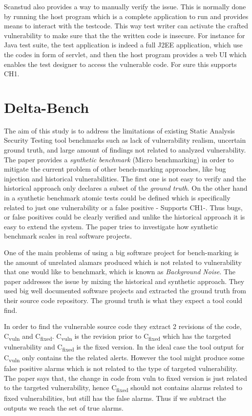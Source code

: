 \documentclass[authoryear,preprint]{sigplanconf}
\begin{document}
Scanstud also provides a way to manually verify the issue. This is normally done by running the host program which is a complete application to run and provides means to interact with the testcode. This way test writer can activate the crafted vulnerability to make sure that the the written code is insecure. For instance for Java test suite, the test application is indeed a full J2EE application, which use the codes in form of servlet, and then the host program provides a web UI which enables the test designer to access the vulnerable code. For sure this supports CH1.

\section{Delta-Bench}
\label{sec:sec_delta}
The aim of this study is to address the limitations of existing Static Analysis Security Testing tool benchmarks such as lack of vulnerability realism, uncertain ground truth, and large amount of findings not related to analyzed vulnerability\cite{8170097}. The paper provides a \textit{synthetic benchmark} (Micro benchmarking) in order to mitigate the current problem of other bench-marking approaches, like bug injection and historical vulnerabilities. The first one is not easy to verify \cite{Dahse:2014:SDS:2671225.2671288} and the historical approach only declares a subset of the \textit{ground truth}. On the other hand in a synthetic benchmark atomic tests could be defined which is specifically related to just one vulnerability or a false positive - Supports CH1-. Thus bugs, or false positives could be clearly verified and unlike the historical approach it is easy to extend the system. The paper tries to investigate how synthetic benchmark scales in real software projects. 

One of the main problems of using a big software project for bench-marking is the amount of unrelated alamars produced which is not related to vulnerability that one would like to benchmark, which is known as \textit{Background Noise}. The paper addresses the issue by mixing the historical and synthetic approach. They used big well documented software projects and extracted the ground truth from their source code repository. The ground truth is what they expect a tool could find.

In order to find the vulnerable source code they extract 2 revisions of the code, C\textsubscript{vuln} and C\textsubscript{fixed}. C\textsubscript{vuln} is the revision prior to C\textsubscript{fixed} which has the targeted vulnerability and C\textsubscript{fixed} is the fixed version. In the ideal case the tool output for C\textsubscript{vuln} only contains the the related alerts. However the tool might produce some false positive alarms which is not related to the type of targeted vulnerability. The paper says that, the change in code from vuln to fixed version is just related to the targeted vulnerability, hence C\textsubscript{fixed} should not contains alarms related to fixed vulnerabilities, but still has the false alarms. Thus if we subtract the outputs we reach the set of true alarms. 
\end{document}
